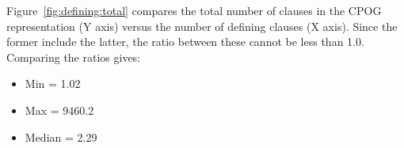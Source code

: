 \documentclass[twoside,11pt]{article}
\begin{document}
Figure~\ref{fig:defining:total} compares the total number of clauses in the CPOG representation (Y axis) versus the number of defining clauses (X axis).  Since the former include the latter, the ratio between these cannot be less than 1.0.
Comparing the ratios gives:
\begin{itemize}
\item Min = 1.02
\item Max = 9460.2
\item Median = 2.29
\end{itemize}
\end{document}
